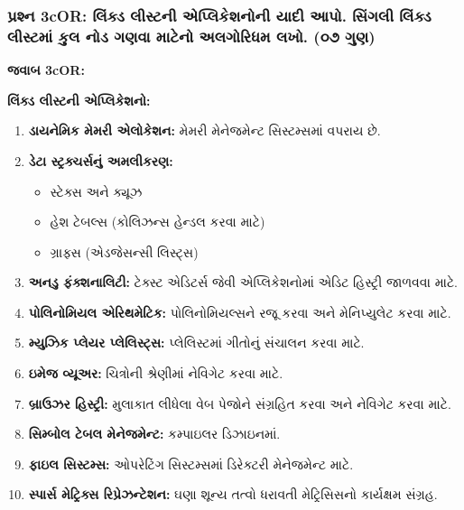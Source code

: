 \hypertarget{uxaaauxab0uxab6uxaa8-3cor-uxab2uxa95uxaa1-uxab2uxab8uxa9fuxaa8-uxa8fuxaaauxab2uxa95uxab6uxaa8uxaa8-uxaafuxaa6-uxa86uxaaa.-uxab8uxa97uxab2-uxab2uxa95uxaa1-uxab2uxab8uxa9fuxaae-uxa95uxab2-uxaa8uxaa1-uxa97uxaa3uxab5-uxaaeuxa9fuxaa8-uxa85uxab2uxa97uxab0uxaa7uxaae-uxab2uxa96.-uxae6uxaed-uxa97uxaa3}{%
\subsubsection{પ્રશ્ન 3cOR: લિંક્ડ લીસ્ટની એપ્લિકેશનોની યાદી આપો. સિંગલી લિંક્ડ
લીસ્ટમાં કુલ નોડ ગણવા માટેનો અલગોરિધમ લખો. (૦૭
ગુણ)}\label{uxaaauxab0uxab6uxaa8-3cor-uxab2uxa95uxaa1-uxab2uxab8uxa9fuxaa8-uxa8fuxaaauxab2uxa95uxab6uxaa8uxaa8-uxaafuxaa6-uxa86uxaaa.-uxab8uxa97uxab2-uxab2uxa95uxaa1-uxab2uxab8uxa9fuxaae-uxa95uxab2-uxaa8uxaa1-uxa97uxaa3uxab5-uxaaeuxa9fuxaa8-uxa85uxab2uxa97uxab0uxaa7uxaae-uxab2uxa96.-uxae6uxaed-uxa97uxaa3}}

\textbf{જવાબ 3cOR:}

\textbf{લિંક્ડ લીસ્ટની એપ્લિકેશનો:}

\begin{enumerate}
\def\labelenumi{\arabic{enumi}.}
\tightlist
\item
  \textbf{ડાયનેમિક મેમરી એલોકેશન:} મેમરી મેનેજમેન્ટ સિસ્ટમ્સમાં વપરાય છે.
\item
  \textbf{ડેટા સ્ટ્રક્ચર્સનું અમલીકરણ:}

  \begin{itemize}
  \tightlist
  \item
    સ્ટેક્સ અને ક્યૂઝ
  \item
    હેશ ટેબલ્સ (કોલિઝન્સ હેન્ડલ કરવા માટે)
  \item
    ગ્રાફ્સ (એડજેસન્સી લિસ્ટ્સ)
  \end{itemize}
\item
  \textbf{અનડુ ફંક્શનાલિટી:} ટેક્સ્ટ એડિટર્સ જેવી એપ્લિકેશનોમાં એડિટ હિસ્ટ્રી જાળવવા
  માટે.
\item
  \textbf{પોલિનોમિયલ એરિથમેટિક:} પોલિનોમિયલ્સને રજૂ કરવા અને મેનિપ્યુલેટ કરવા
  માટે.
\item
  \textbf{મ્યુઝિક પ્લેયર પ્લેલિસ્ટ્સ:} પ્લેલિસ્ટમાં ગીતોનું સંચાલન કરવા માટે.
\item
  \textbf{ઇમેજ વ્યૂઅર:} ચિત્રોની શ્રેણીમાં નેવિગેટ કરવા માટે.
\item
  \textbf{બ્રાઉઝર હિસ્ટ્રી:} મુલાકાત લીધેલા વેબ પેજોને સંગ્રહિત કરવા અને નેવિગેટ કરવા
  માટે.
\item
  \textbf{સિમ્બોલ ટેબલ મેનેજમેન્ટ:} કમ્પાઇલર ડિઝાઇનમાં.
\item
  \textbf{ફાઇલ સિસ્ટમ્સ:} ઓપરેટિંગ સિસ્ટમ્સમાં ડિરેક્ટરી મેનેજમેન્ટ માટે.
\item
  \textbf{સ્પાર્સ મેટ્રિક્સ રિપ્રેઝન્ટેશન:} ઘણા શૂન્ય તત્વો ધરાવતી મેટ્રિસિસનો કાર્યક્ષમ
  સંગ્રહ.
\end{enumerate}

